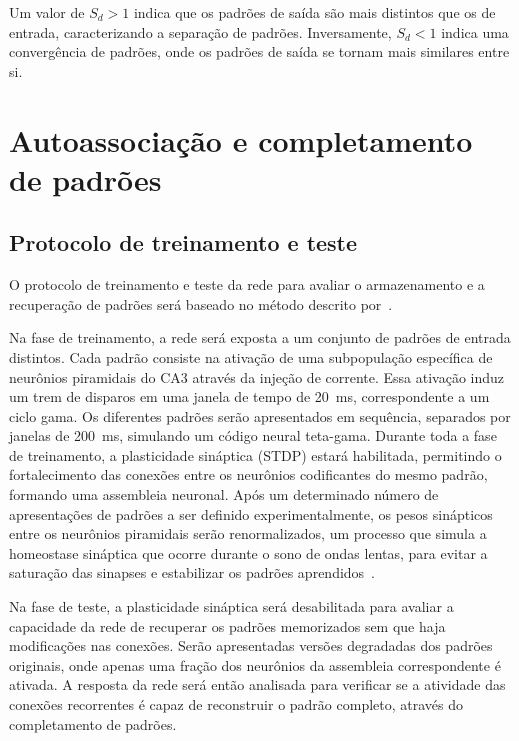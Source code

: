 Um valor de $S_d > 1$ indica que os padrões de saída são mais distintos que os de entrada, caracterizando a separação de padrões. Inversamente, $S_d < 1$ indica uma convergência de padrões, onde os padrões de saída se tornam mais similares entre si.

\section{Autoassociação e completamento de padrões}

\subsection{Protocolo de treinamento e teste}\label{sec:protocolo_treinamento_teste}

O protocolo de treinamento e teste da rede para avaliar o armazenamento e a recuperação de padrões será baseado no método descrito
por~\cite{kopsickFormation2024}.

Na fase de treinamento, a rede será exposta a um conjunto de padrões de entrada distintos. Cada padrão consiste na ativação de uma
subpopulação específica de neurônios piramidais do CA3 através da injeção de corrente. Essa ativação induz um trem de disparos em
uma janela de tempo de \SI{20}{\milli\second}, correspondente a um ciclo gama. Os diferentes padrões serão apresentados em
sequência, separados por janelas de \SI{200}{\milli\second}, simulando um código neural teta-gama. Durante toda a fase de
treinamento, a plasticidade sináptica (STDP) estará habilitada, permitindo o fortalecimento das conexões entre os neurônios
codificantes do mesmo padrão, formando uma assembleia neuronal. Após um determinado número de apresentações de padrões a ser
definido experimentalmente, os pesos sinápticos entre os neurônios piramidais serão renormalizados, um processo que simula a
homeostase sináptica que ocorre durante o sono de ondas lentas, para evitar a saturação das sinapses e estabilizar os padrões
aprendidos~\cite{gonzalez-ruedaActivityDependent2018, kopsickFormation2024}.

Na fase de teste, a plasticidade sináptica será desabilitada para avaliar a capacidade da rede de recuperar os padrões memorizados
sem que haja modificações nas conexões. Serão apresentadas versões degradadas dos padrões originais, onde apenas uma fração dos
neurônios da assembleia correspondente é ativada. A resposta da rede será então analisada para verificar se a atividade das
conexões recorrentes é capaz de reconstruir o padrão completo, através do completamento de padrões.

